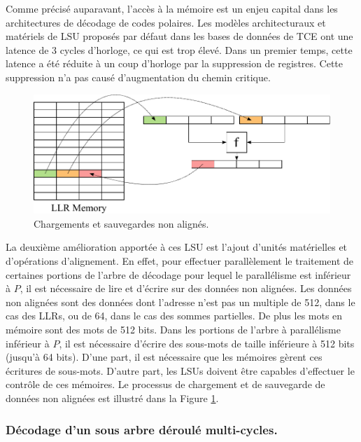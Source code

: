 Comme précisé auparavant, l'accès à la mémoire est un enjeu capital dans les architectures de décodage de codes polaires. Les modèles architecturaux et matériels de LSU proposés par défaut dans les bases de données de TCE ont une latence de 3 cycles d'horloge, ce qui est trop élevé. Dans un premier temps, cette latence a été réduite à un coup d'horloge par la suppression de registres. Cette suppression n'a pas causé d'augmentation du chemin critique.
\begin{figure}[htp]
	\centering
	\includegraphics[width=\textwidth]{main/ch4_fig/unaligned}
	\caption{Chargements et sauvegardes non alignés.}
	\label{fig:unaligned}
\end{figure}

La deuxième amélioration apportée à ces LSU est l'ajout d'unités matérielles et d'opérations d'alignement. En effet, pour effectuer parallèlement le traitement de certaines portions de l'arbre de décodage pour lequel le parallélisme est inférieur à $P$, il est nécessaire de lire et d'écrire sur des données non alignées. Les données non alignées sont des données dont l'adresse n'est pas un multiple de 512, dans le cas des LLRs, ou de 64, dans le cas des sommes partielles. De plus les mots en mémoire sont des mots de 512 bits. Dans les portions de l'arbre à parallélisme inférieur à $P$, il est nécessaire d'écrire des sous-mots de taille inférieure à 512 bits (jusqu'à 64 bits). D'une part, il est nécessaire que les mémoires gèrent ces écritures de sous-mots. D'autre part, les LSUs doivent être capables d'effectuer le contrôle de ces mémoires. Le processus de chargement et de sauvegarde de données non alignées est illustré dans la Figure \ref{fig:unaligned}.

\subsubsection{Décodage d'un sous arbre déroulé multi-cycles.}

